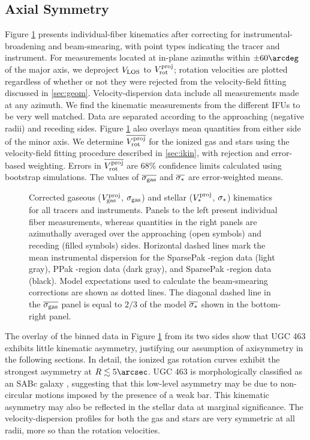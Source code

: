 \documentclass[apj,iop,numberedappendix]{emulateapj}
\begin{document}
\subsection{Axial Symmetry}
\label{sec:axisym}

Figure \ref{fig:beamc} presents individual-fiber kinematics after correcting for
instrumental-broadening and beam-smearing, with point types indicating the
tracer and instrument.  For measurements located at in-plane azimuths within
$\pm60\arcdeg$ of the major axis, we deproject $V_{\rm LOS}$ to $V_{\rm rot}^{\rm proj}$; rotation
velocities are plotted regardless of whether or not they were rejected from the
velocity-field fitting discussed in \sect \ref{sec:geom}.  Velocity-dispersion
data include all measurements made at any azimuth.  We find the kinematic
measurements from the different IFUs to be very well matched.  Data are
separated according to the approaching (negative radii) and receding sides.
Figure \ref{fig:beamc} also overlays mean quantities from either side of the
minor axis.  We determine $\overline{V_{\rm rot}^{\rm proj}}$ for the ionized gas and stars
using the velocity-field fitting procedure described in \sect \ref{sec:ikin},
with rejection and error-based weighting.  Errors in $\overline{V_{\rm rot}^{\rm proj}}$ are
68\% confidence limits calculated using bootstrap simulations.  The values of
$\overline{\sigma_{\rm gas}}$ and $\overline{\sigma_{\ast}}$ are error-weighted means.

\begin{figure}
\caption{
%
Corrected gaseous ($V_{\rm gas}^{\rm proj}$, $\sigma_{\rm gas}$) and stellar ($V_{\ast}^{\rm
proj}$, $\sigma_{\ast}$) kinematics for all tracers and instruments.  Panels to the
left present individual fiber measurements, whereas quantities in the right
panels are azimuthally averaged over the approaching (open symbols) and receding
(filled symbols) sides.  Horizontal dashed lines mark the mean instrumental
dispersion for the SparsePak \halp-region data (light gray), PPak \mgi-region
data (dark gray), and SparsePak \mgi-region data (black).  Model expectations
used to calculate the beam-smearing corrections are shown as dotted lines.  The
diagonal dashed line in the $\overline{\sigma_{\rm gas}}$ panel is equal to $2/3$ of the
model $\overline{\sigma_{\ast}}$ shown in the bottom-right panel.
%
}
\label{fig:beamc}
\end{figure}

The overlay of the binned data in Figure \ref{fig:beamc} from its two sides show
that UGC 463 exhibits little kinematic asymmetry, justifying our assumption of
axisymmetry in the following sections.  In detail, the ionized gas rotation
curves exhibit the strongest asymmetry at $R\lesssim5\arcsec$.  UGC 463 is
morphologically classified as an SABc galaxy ,
suggesting that this low-level asymmetry may be due to non-circular motions
imposed by the presence of a weak bar.  This kinematic asymmetry may also be
reflected in the stellar data at marginal significance.  The velocity-dispersion
profiles for both the gas and stars are very symmetric at all radii, more so
than the rotation velocities.
\end{document}
